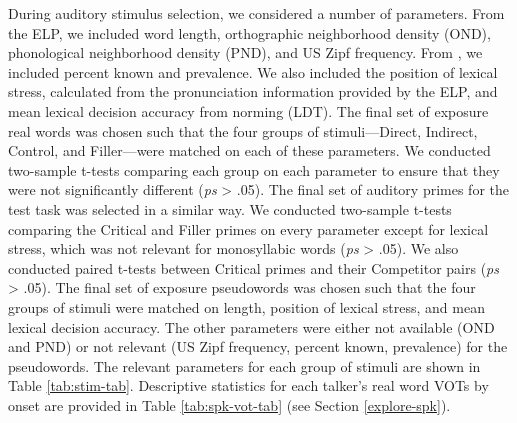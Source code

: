 \documentclass[preprint, 3p, authoryear]{elsarticle} %
\begin{document}
During auditory stimulus selection, we considered a number of parameters.
From the ELP, we included word length, orthographic neighborhood density (OND), phonological neighborhood density (PND), and US Zipf frequency.
From \citet{brysbaert2019}, we included percent known and prevalence.
We also included the position of lexical stress, calculated from the pronunciation information provided by the ELP, and mean lexical decision accuracy from norming (LDT).
The final set of exposure real words was chosen such that the four groups of stimuli---Direct, Indirect, Control, and Filler---were matched on each of these parameters.
We conducted two-sample t-tests comparing each group on each parameter to ensure that they were not significantly different (\emph{ps} \textgreater{} .05).
The final set of auditory primes for the test task was selected in a similar way.
We conducted two-sample t-tests comparing the Critical and Filler primes on every parameter except for lexical stress, which was not relevant for monosyllabic words (\emph{ps} \textgreater{} .05).
We also conducted paired t-tests between Critical primes and their Competitor pairs (\emph{ps} \textgreater{} .05).
The final set of exposure pseudowords was chosen such that the four groups of stimuli were matched on length, position of lexical stress, and mean lexical decision accuracy.
The other parameters were either not available (OND and PND) or not relevant (US Zipf frequency, percent known, prevalence) for the pseudowords.
The relevant parameters for each group of stimuli are shown in Table \ref{tab:stim-tab}.
Descriptive statistics for each talker's real word VOTs by onset are provided in Table \ref{tab:spk-vot-tab} (see Section \ref{explore-spk}).
\end{document}
